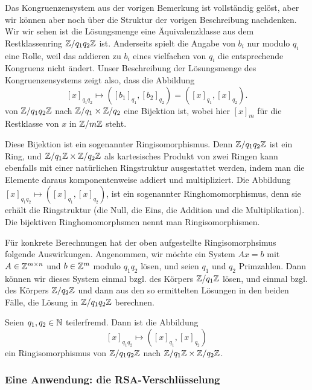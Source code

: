 	\begin{bem}
		Das Kongruenzensystem aus der vorigen Bemerkung ist vollständig gelöst, aber wir können aber noch über die Struktur der vorigen Beschreibung nachdenken. 
		Wir wir sehen ist die Lösungsmenge eine Äquivalenzklasse aus dem Restklassenring $\mathbb Z/ q_1 q_2 \mathbb Z$ ist. Anderseits spielt die Angabe von $b_i$ nur modulo $q_i$ eine Rolle, weil das addieren zu $b_i$ eines vielfachen von $q_i$ die entsprechende Kongruenz nicht ändert. Unser Beschreibung der Lösungsmenge des Kongruenzensystems zeigt also, dass die Abbildung 
		\[
		[x]_{q_1 q_2} \mapsto ([b_1]_{q_1}, [b_2]_{q_2}) = ([x]_{q_1},[x]_{q_2}). 
		\]
		von $\mathbb Z / q_1 q_2 \mathbb Z$ nach $\mathbb Z / q_1 \times \mathbb Z/ q_2$ eine Bijektion ist, wobei hier $[x]_m$ für die Restklasse von $x$ in $\mathbb Z/ m \mathbb Z$ steht. 
		
		Diese Bijektion ist ein sogenannter Ringisomorphismus. Denn $\mathbb Z / q_1q_2 \mathbb Z$ ist ein Ring, und $\mathbb Z  / q_1 \mathbb Z \times \mathbb Z / q_2 \mathbb Z$ als kartesisches Produkt von zwei Ringen kann ebenfalls mit einer natürlichen Ringstruktur ausgestattet werden, indem man die Elemente daraus komponentenweise addiert und multipliziert. Die Abbildung $[x]_{q_1 q_2} \mapsto ([x]_{q_1} , [x]_{q_2})$, ist ein sogenannter Ringhomomorphismus, denn sie erhält die Ringstruktur (die Null, die Eins, die Addition und die Multiplikation). Die bijektiven Ringhomomorphsmen nennt man Ringisomorphismen. 
		
		Für konkrete Berechnungen hat der oben aufgestellte Ringisomorphsimus folgende Auswirkungen. Angenommen, wir möchte ein System $A x =b$ mit $A \in \mathbb Z^{m \times n}$ und $b \in \mathbb Z^m$ modulo $q_1 q_2$ lösen, und seien $q_1$ und $q_2$ Primzahlen. Dann können wir dieses System einmal bzgl. des Körpers $ \mathbb Z / q_1 \mathbb Z$ lösen, und einmal bzgl. des Körpers $\mathbb Z / q_2 \mathbb Z$ und dann aus den so ermittelten Lösungen in den beiden Fälle, die Lösung in $\mathbb Z / q_1 q_2 \mathbb Z$ berechnen. 
	\end{bem} 
	
	
	\begin{thm} 
		Seien $q_1, q_2 \in \mathbb N$ teilerfremd. Dann ist die Abbildung 
		\[
		[x]_{q_1 q_2} \mapsto ([x]_{q_1}, [x]_{q_2})
		\]
		ein Ringisomorphismus von $\mathbb Z / q_1 q_2 \mathbb Z$ nach $\mathbb Z / q_1 \mathbb Z \times \mathbb Z / q_2 \mathbb Z$. 
	\end{thm}
	
	\subsubsection{Eine Anwendung: die RSA-Verschlüsselung}
	
